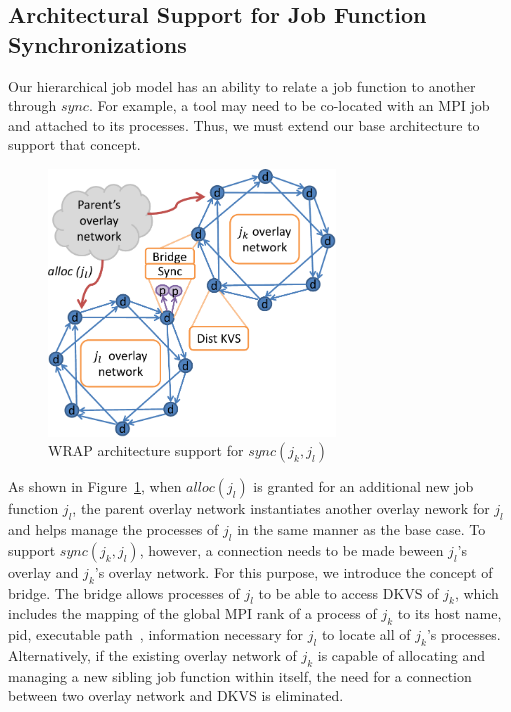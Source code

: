 \documentclass[10pt]{article}
\begin{document}
\subsection{Architectural Support for Job Function Synchronizations} 
\label{sect:sync}
Our hierarchical job model has an ability to relate a job function 
to another through $sync$. 
For example, a tool may need to be co-located with an MPI job 
and attached to its processes. 
Thus, we must extend our base architecture to support that concept. 
\begin{figure}
  \centering
    \includegraphics[width=3.0in]{fig/WRAP_newJobFunction}
  \caption{WRAP architecture support for ${sync(j_k, j_l)}$}
  \label{syncext}
\end{figure}
As shown in Figure~\ref{syncext}, when $alloc(j_l)$ 
is granted for an additional new job function $j_l$, 
the parent overlay network instantiates
another overlay nework for $j_l$ and helps manage
the processes of $j_l$ in the same manner as the base case. 
To support ${sync(j_k, j_l)}$,
however, a connection needs to be made beween $j_l$'s 
overlay and $j_k$'s overlay network. 
For this purpose, we introduce the concept
of bridge. The bridge allows processes
of $j_l$ to be able to access DKVS of $j_k$, which includes
the mapping of the global MPI rank of a process of $j_k$
to its host name, pid, executable path~\cite{MPIRInterface},
information necessary for $j_l$ to locate all of $j_k$'s processes.
Alternatively, if the existing overlay network of $j_k$ is
capable of allocating and managing a new sibling job function 
within itself, the need for a connection between two overlay   
network and DKVS is eliminated.
\end{document}
